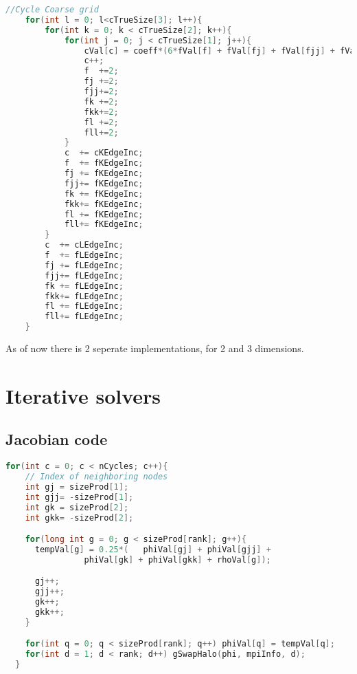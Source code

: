 \newpage
\begin{lstlisting}[language=c, caption = The foor loop doing the calculations]
	//Cycle Coarse grid
	for(int l = 0; l<cTrueSize[3]; l++){
		for(int k = 0; k < cTrueSize[2]; k++){
			for(int j = 0; j < cTrueSize[1]; j++){
				cVal[c] = coeff*(6*fVal[f] + fVal[fj] + fVal[fjj] + fVal[fk] + fVal[fkk] + fVal[fl] + fVal[fll]);
				c++;
				f  +=2;
				fj +=2;
				fjj+=2;
				fk +=2;
				fkk+=2;
				fl +=2;
				fll+=2;
			}
			c  += cKEdgeInc;
			f  += fKEdgeInc;
			fj += fKEdgeInc;
			fjj+= fKEdgeInc;
			fk += fKEdgeInc;
			fkk+= fKEdgeInc;
			fl += fKEdgeInc;
			fll+= fKEdgeInc;
		}
		c  += cLEdgeInc;
		f  += fLEdgeInc;
		fj += fLEdgeInc;
		fjj+= fLEdgeInc;
		fk += fLEdgeInc;
		fkk+= fLEdgeInc;
		fl += fLEdgeInc;
		fll+= fLEdgeInc;
	}
\end{lstlisting}

As of now there is 2 seperate implementations, for 2 and 3 dimensions.



\newpage
\section{Iterative solvers}
\subsection{Jacobian code}
\label{sec:jacobian}

\begin{lstlisting}[language=c, caption = Code snippet 2D jacobian]
  for(int c = 0; c < nCycles; c++){
    // Index of neighboring nodes
    int gj = sizeProd[1];
    int gjj= -sizeProd[1];
    int gk = sizeProd[2];
    int gkk= -sizeProd[2];

    for(long int g = 0; g < sizeProd[rank]; g++){
      tempVal[g] = 0.25*(	phiVal[gj] + phiVal[gjj] +
                phiVal[gk] + phiVal[gkk] + rhoVal[g]);

      gj++;
      gjj++;
      gk++;
      gkk++;
    }

    for(int q = 0; q < sizeProd[rank]; q++) phiVal[q] = tempVal[q];
    for(int d = 1; d < rank; d++) gSwapHalo(phi, mpiInfo, d);
  }
\end{lstlisting}

\newpage
